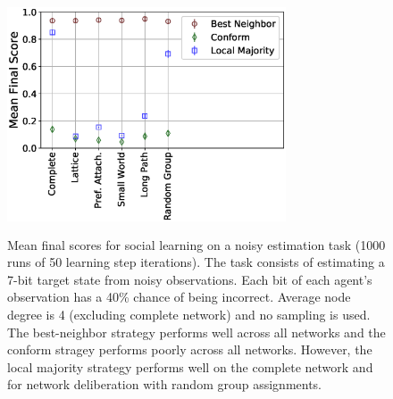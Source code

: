 \begin{figure}
    \centering
    \includegraphics[width=3.25in,height=2.75in]{fig-performance-estimation-nosample.eps}
    \caption{Mean final scores for social learning on a noisy estimation task (1000 runs of 50 learning step iterations). The task consists of estimating a 7-bit target state from noisy observations. Each bit of each agent's observation has a 40\% chance of being incorrect. Average node degree is 4 (excluding complete network) and no sampling is used. The best-neighbor strategy performs well across all networks and the conform stragey performs poorly across all networks. However, the local majority strategy performs well on the complete network and for network deliberation with random group assignments.}
    \label{fig:result-nosample}
\end{figure}
